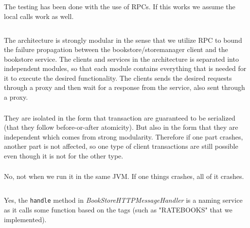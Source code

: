 \documentclass[a4paper]{article}
\begin{document}
\subsubsection{}
The testing has been done with the use of RPCs. If this works we assume the local calls work as well.

\subsection{}
\subsubsection{}
The architecture is strongly modular in the sense that we utilize RPC to bound the failure propagation between the bookstore/storemanager client and the bookstore service. The clients and services in the architecture is separated into independent modules, so that each module contains everything that is needed for it to execute the desired functionality. The clients sends the desired requests through a proxy and then wait for a response from the service, also sent through a proxy.

\subsubsection{}
They are isolated in the form that transaction are guaranteed to be serialized (that they follow before-or-after atomicity). But also in the form that they are independent which comes from strong modularity. Therefore if one part crashes, another part is not affected, so one type of client transactions are still possible even though it is not for the other type.

\subsubsection{}
No, not when we run it in the same JVM. If one things crashes, all of it crashes.

\subsection{}
\subsubsection{}
Yes, the \texttt{handle} method in \textit{BookStoreHTTPMessageHandler} is a naming service as it calls some function based on the tags (such as "RATEBOOKS" that we implemented).
\end{document}

